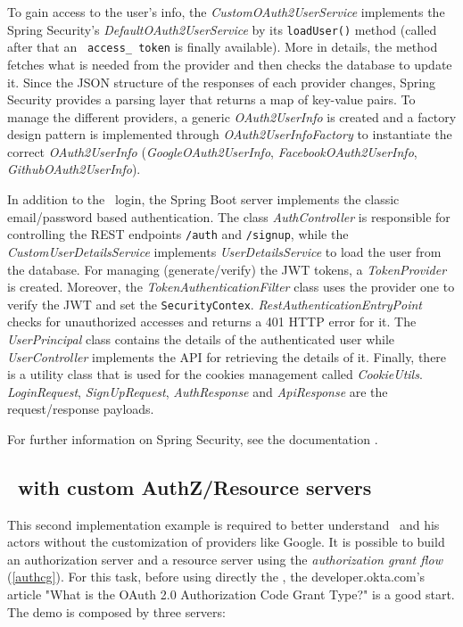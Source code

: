 To gain access to the user's info, the \textit{CustomOAuth2UserService} implements the Spring Security's \textit{DefaultOAuth2UserService} by its \texttt{loadUser()} method (called after that an \oauth\ \texttt{access\_ token} is finally available). More in details, the method fetches what is needed from the provider and then checks the database to update it. Since the JSON structure of the responses of each provider changes, Spring Security provides a parsing layer that returns a map of key-value pairs. To manage the different providers, a generic \textit{OAuth2UserInfo} is created and a factory design pattern is implemented through \textit{OAuth2UserInfoFactory} to instantiate the correct \textit{OAuth2UserInfo} (\textit{GoogleOAuth2UserInfo}, \textit{FacebookOAuth2UserInfo}, \textit{GithubOAuth2UserInfo}).

In addition to the \oauth\ login, the Spring Boot server implements the classic email/password based authentication. The class \textit{AuthController} is responsible for controlling the REST endpoints \texttt{/auth} and \texttt{/signup}, while the \textit{CustomUserDetailsService} implements \textit{UserDetailsService} to load the user from the database. For managing (generate/verify) the JWT tokens, a \textit{TokenProvider} is created. Moreover, the \textit{TokenAuthenticationFilter} class uses the provider one to verify the JWT and set the \texttt{SecurityContex}. \textit{RestAuthenticationEntryPoint} checks for unauthorized accesses and returns a 401 HTTP error for it. The \textit{UserPrincipal} class contains the details of the authenticated user while \textit{UserController} implements the API for retrieving the details of it. Finally, there is a utility class that is used for the cookies management called \textit{CookieUtils}. \textit{LoginRequest}, \textit{SignUpRequest}, \textit{AuthResponse} and \textit{ApiResponse} are the request/response payloads.

For further information on Spring Security, see the documentation \cite{sprsec}.

\subsection{\oauth\ with custom AuthZ/Resource servers}
This second implementation example is required to better understand \oauth\ and his actors without the customization of providers like Google. It is possible to build an authorization server and a resource server using the \textit{authorization grant flow} (\ref{authcg}). For this task, before using directly the , the developer.okta.com's article "What is the OAuth 2.0 Authorization Code Grant Type?" \cite{oauth2} is a good start. The demo is composed by three servers:

